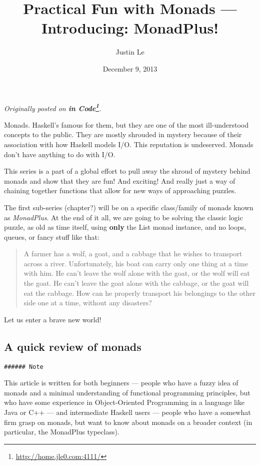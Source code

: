 \documentclass[]{article}
\title{Practical Fun with Monads --- Introducing: MonadPlus!}
\author{Justin Le}
\date{December 9, 2013}
\renewcommand{\href}[2]{#2\footnote{\url{#1}}}
\begin{document}
\maketitle

\emph{Originally posted on \textbf{\href{http://home.jle0.com:4111/}{in
Code}}.}

Monads. Haskell's famous for them, but they are one of the most
ill-understood concepts to the public. They are mostly shrouded in
mystery because of their association with how Haskell models I/O. This
reputation is undeserved. Monads don't have anything to do with I/O.

This series is a part of a global effort to pull away the shroud of
mystery behind monads and show that they are fun! And exciting! And
really just a way of chaining together functions that allow for new ways
of approaching puzzles.

The first sub-series (chapter?) will be on a specific class/family of
monads known as \emph{MonadPlus}. At the end of it all, we are going to
be solving the classic logic puzzle, as old as time itself, using
\textbf{only} the List monad instance, and no loops, queues, or fancy
stuff like that:

\begin{quote}
A farmer has a wolf, a goat, and a cabbage that he wishes to transport
across a river. Unfortunately, his boat can carry only one thing at a
time with him. He can't leave the wolf alone with the goat, or the wolf
will eat the goat. He can't leave the goat alone with the cabbage, or
the goat will eat the cabbage. How can he properly transport his
belongings to the other side one at a time, without any disasters?
\end{quote}

Let us enter a brave new world!

\subsection{A quick review of monads}\label{a-quick-review-of-monads}

\begin{verbatim}
###### Note
\end{verbatim}

This article is written for both beginners --- people who have a fuzzy
idea of monads and a minimal understanding of functional programming
principles, but who have some experience in Object-Oriented Programming
in a language like Java or C++ --- and intermediate Haskell users ---
people who have a somewhat firm grasp on monads, but want to know about
monads on a broader context (in particular, the MonadPlus typeclass).
\end{document}

